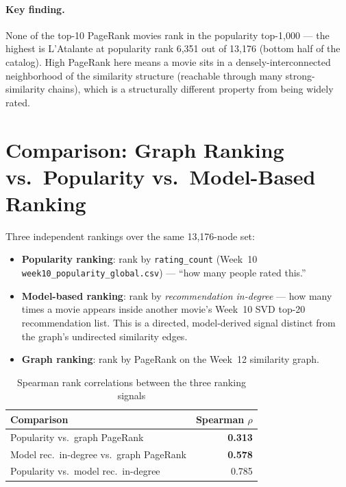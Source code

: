 \documentclass[12pt,a4paper]{article}
\begin{document}
\paragraph{Key finding.} None of the top-10 PageRank movies rank in the popularity top-1,000 ---
the highest is L'Atalante at popularity rank 6,351 out of 13,176 (bottom half of the catalog). High
PageRank here means a movie sits in a densely-interconnected neighborhood of the similarity
structure (reachable through many strong-similarity chains), which is a structurally different
property from being widely rated.

\section{Comparison: Graph Ranking vs.\ Popularity vs.\ Model-Based Ranking}
\label{sec:comparison}

Three independent rankings over the same 13,176-node set:

\begin{itemize}[nosep]
  \item \textbf{Popularity ranking}: rank by \texttt{rating\_count} (Week~10
    \texttt{week10\_popularity\_global.csv}) --- ``how many people rated this.''
  \item \textbf{Model-based ranking}: rank by \emph{recommendation in-degree} --- how many times a
    movie appears inside another movie's Week~10 SVD top-20 recommendation list. This is a
    directed, model-derived signal distinct from the graph's undirected similarity edges.
  \item \textbf{Graph ranking}: rank by PageRank on the Week~12 similarity graph.
\end{itemize}

\begin{table}[H]
\centering
\caption{Spearman rank correlations between the three ranking signals}
\begin{tabular}{lr}
\toprule
\textbf{Comparison} & \textbf{Spearman $\rho$} \\
\midrule
Popularity vs.\ graph PageRank & \textbf{0.313} \\
Model rec.\ in-degree vs.\ graph PageRank & \textbf{0.578} \\
Popularity vs.\ model rec.\ in-degree & 0.785 \\
\bottomrule
\end{tabular}
\end{table}
\end{document}
